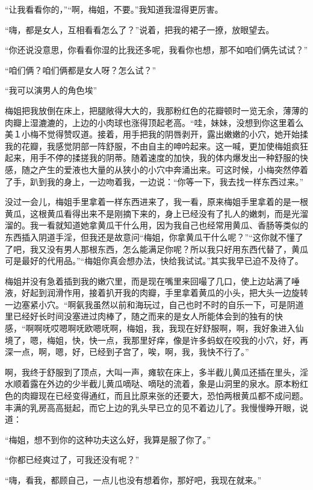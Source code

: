 \documentclass[12pt,UTF8]{ctexbook}
\begin{document}
“让我看看你的，”“啊，梅姐，不要。”我知道我湿得更厉害。

“嗨，都是女人，互相看看怎么了？”说着，把我的裙子一撩，放眼望去。

“你还说没意思，你看看你湿的比我还多呢，我看你也想，那不如咱们俩先试试？”

“咱们俩？咱们俩都是女人呀？怎么试？”

“我可以演男人的角色埃”

梅姐把我放倒在床上，把腿敞得大大的，我那粉红色的花瓣顿时一览无余，薄薄的肉瓣上湿漉漉的，上边的小肉球也涨得顶起老高。“哇，妹妹，没想到你这里着么美１小梅不觉得赞叹道。接着，用手把我的阴唇剥开，露出嫩嫩的小穴，她开始揉我的花瓣，我感觉阴部一阵舒服，不由自主的呻吟起来。这一喊，更加使梅姐疯狂起来，用手不停的揉搓我的阴蒂。随着速度的加快，我的体内爆发出一种舒服的快感，随之产生的爱液也大量的从狭小的小穴中奔涌出来。可这时候，小梅突然停着了手，趴到我的身上，一边吻着我，一边说：“你等一下，我去找一样东西过来。”

没过一会儿，梅姐手里拿着一样东西进来了，我一看，原来梅姐手里拿着的是一根黄瓜，这根黄瓜看得出来不是刚摘下来的，身上已经没有了扎人的嫩刺，而是光溜溜的。我一看就知道她拿黄瓜干什么用，因为我自己也经常用黄瓜、香肠等类似的东西插入阴道手淫，但我还是故意问“梅姐，你拿黄瓜干什么呢？”“这你就不懂了了吧，我又没有男人那根东西，怎么能满足你呢？所以我只好用东西代替了，黄瓜可是最好的代用品。”“梅姐你真会想办法，快给我试试。”其实我早已迫不及待了。

梅姐并没有急着插到我的嫩穴里，而是现在嘴里来回嘬了几口，使上边站满了唾液，好起到润滑作用，接着扒开我的肉瓣，手里拿着黄瓜的小头，把大头一边旋转一边塞紧小穴。“啊氨我虽然以前和海玩过，自己也时不时的自乐一下，可是阴道里已经好长时间没塞进过肉棒了，随之而来的是女人所能体会到的独有的快感，“啊啊呒哎嗯啊呒欧嗯呒啊，梅姐，我，我现在好舒服啊，啊，我好象进入仙境了，嗯，梅姐，快，快一点，我那里好痒，像是许多蚂蚁在咬我的小穴，好，再深一点，啊，嗯，好，已经到子宫了，唉，啊，我，我快不行了。”

啊，我终于舒服到了顶点，大叫一声，瘫软在床上，多半截儿黄瓜还插在里头，淫水顺着露在外边的少半截儿黄瓜嘀哒、嘀哒的流着，象是山洞里的泉水。原本粉红色的肉瓣现在已经变得通红，而且比原来张的还要大，恐怕两根黄瓜都不成问题。丰满的乳房高高挺起，而它上边的乳头早已立的见不着边儿了。我慢慢睁开眼，说道：

“梅姐，想不到你的这种功夫这么好，我算是服了你了。”

“你都已经爽过了，可我还没有呢？”

“嗨，看我，都顾自己，一点儿也没有想着你，那好吧，我现在就来。”
\end{document}
